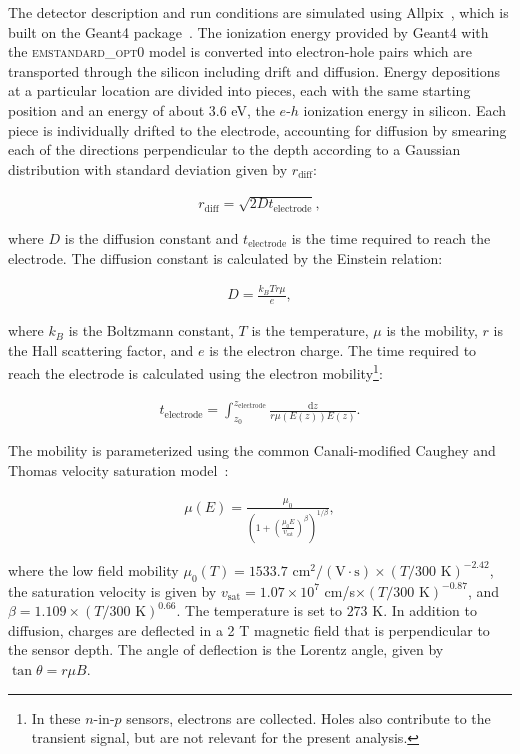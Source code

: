 \documentclass[12pt]{article}
\begin{document}
The detector description and run conditions are simulated using Allpix~\cite{benoit:20xx}, which is built on the Geant4 package~\cite{Agostinelli:2002hh}.   The ionization energy provided by Geant4 with the \textsc{emstandard\_opt0} model is converted into electron-hole pairs which are transported through the silicon including drift and diffusion.  Energy depositions at a particular location are divided into pieces, each with the same starting position and an energy of about 3.6 eV, the $e$-$h$ ionization energy in silicon.  Each piece is individually drifted to the electrode, accounting for diffusion by smearing each of the directions perpendicular to the depth according to a Gaussian distribution with standard deviation given by $r_\text{diff}$:

\begin{align}
\label{eq:rdiff}
r_\text{diff}=\sqrt{2Dt_\text{electrode}},
\end{align}

\noindent where $D$ is the diffusion constant and $t_\text{electrode}$ is the time required to reach the electrode.  The diffusion constant is calculated by the Einstein relation:

\begin{align}
\label{eq:diffconstant}
D=\frac{k_BTr\mu}{e},
\end{align}

\noindent where $k_B$ is the Boltzmann constant, $T$ is the temperature, $\mu$ is the mobility, $r$ is the Hall scattering factor, and $e$ is the electron charge.  The time required to reach the electrode is calculated using the electron mobility\footnote{In these $n$-in-$p$ sensors, electrons are collected.  Holes also contribute to the transient signal, but are not relevant for the present analysis.}:

\begin{align}
\label{eq:difftime}
t_\text{electrode} = \int_{z_0}^{z_\text{electrode}}\frac{\text{d}z}{r\mu(E(z))E(z)}.
\end{align}

\noindent The mobility is parameterized using the common Canali-modified Caughey and Thomas velocity saturation model~\cite{Caughey1967,Canali1975}:

\begin{align}
\mu(E)=\frac{\mu_0}{\left(1+\left(\frac{\mu_0E}{v_\text{sat}}\right)^\beta\right)^{1/\beta}},
\end{align}

\noindent where the low field mobility $\mu_0(T)=1533.7$ cm$^2/(\text{V}\cdot\text{s})\times(T/\text{300 K})^{-2.42}$, the saturation velocity is given by $v_\text{sat}=1.07\times 10^7$ cm/s$\times (T/\text{300 K})^{-0.87}$, and $\beta=1.109\times(T/\text{300 K})^{0.66}$.   The temperature is set to $273$ K.  In addition to diffusion, charges are deflected in a 2 T magnetic field that is perpendicular to the sensor depth.  The angle of deflection is the Lorentz angle, given by $\tan\theta =r \mu B$. %
\end{document}
